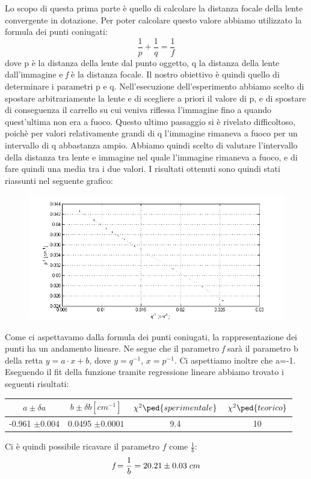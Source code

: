 \documentclass[a4paper,11pt]{article}
\begin{document}
Lo scopo di questa prima parte è quello di calcolare la distanza focale della lente convergente in dotazione. Per poter calcolare questo valore abbiamo utilizzato la formula dei punti coniugati: $$\frac{1}{p}+\frac{1}{q}=\frac{1}{\textit{f}}$$
dove p è la distanza della lente dal punto oggetto, q la distanza della lente dall'immagine e \textit{f} è la distanza focale. Il nostro obiettivo è quindi quello di determinare i parametri p e q. Nell'esecuzione dell'esperimento abbiamo scelto di spostare arbitrariamente la lente e di scegliere a priori il valore di p, e di spostare di conseguenza il carrello su cui veniva riflessa l'immagine fino a quando quest'ultima non era a fuoco. Questo ultimo passaggio si è rivelato difficoltoso, poichè per valori relativamente grandi di q l'immagine rimaneva a fuoco per un intervallo di q abbastanza ampio. Abbiamo quindi scelto di valutare l'intervallo della distanza tra lente e immagine nel quale l'immagine rimaneva a fuoco, e di fare quindi una media tra i due valori. I risultati ottenuti sono quindi stati riassunti nel seguente grafico:
 \begin{center} 
\begin{figure}[htpd]
\hspace{30 pt}
\includegraphics[scale=0.65]{graficoP_Q.png}


\end{figure}
\end{center}

Come ci aspettavamo dalla formula dei punti coniugati, la rappresentazione dei punti ha un andamento lineare. Ne segue che il parametro \textit{f} sarà il parametro b della retta $y=a\cdot x+b$, dove $y=q^{-1}$, $x=p^{-1}$. Ci aspettiamo inoltre che a=-1. Eseguendo il fit della funzione tramite regressione lineare abbiamo trovato i seguenti risultati:\\
\begin{center}

  
\begin{tabular}{|c|c|c|c|}
\hline $a \pm \delta a$ & $b \pm \delta b [cm^{-1}]$ & $\chi ^{2}\ped{sperimentale}$ & $\chi ^{2}\ped{teorico}$ \\ 
\hline -0.961 $\pm 0.004$ & 0.0495 $\pm 0.0001$ & 9.4 & 10 \\ 
\hline 
\end{tabular}
\end{center} 
Ci è quindi possibile ricavare il parametro $\textit{f}$ come $\frac{1}{b}$: $$\textit{f}=\frac{1}{b}=20.21 \pm 0.03\hspace{1 mm} cm$$
\end{document}
